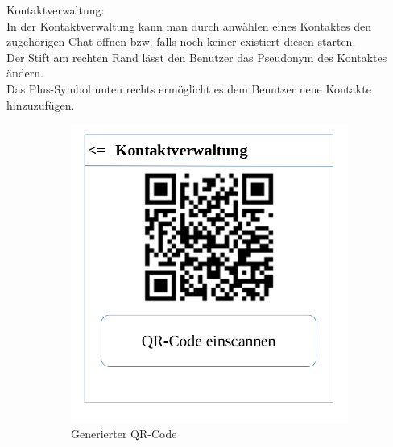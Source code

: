 Kontaktverwaltung:\\
In der Kontaktverwaltung kann man durch anwählen eines Kontaktes den zugehörigen Chat öffnen bzw. falls noch keiner existiert diesen starten.\\
Der Stift am rechten Rand lässt den Benutzer das Pseudonym des Kontaktes ändern.\\
Das Plus-Symbol unten rechts ermöglicht es dem Benutzer neue Kontakte hinzuzufügen.\\

\begin{figure}[h]
\centering
\begin{subfigure}{.5\textwidth}
  \centering
  \includegraphics[scale=0.3]{gui/Kontaktverwaltung_QR_Code_generiert.png}
  \caption{Generierter QR-Code}
\end{subfigure}%
\begin{subfigure}{.5\textwidth}
  \centering

\end{subfigure}
\end{figure}
